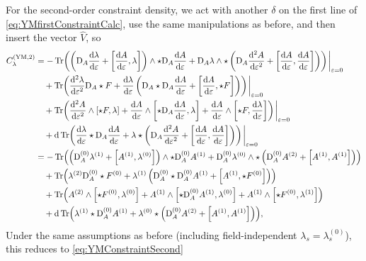 \documentclass[]{jkpaper}
\theoremstyle{plain}
\theoremstyle{definition}
\newcommand{\eps}{\varepsilon}
\newcommand{\DD}[1]{\text{D}_A#1}
\begin{document}
For the second-order constraint density, we act with another $\delta$ on the first line of \eqref{eq:YMfirstConstraintCalc}, use the same manipulations as before, and then insert the vector $\hat{V}$, so 
\begin{equation}
    \begin{split}
        C_\lambda^{(\text{YM},2)}
        &= -\Tr(\left(\DD \dv{\lambda}{\eps} + \comm{\dv{A}{\eps}}{\lambda} \right) \wedge \star \DD \dv{A}{\eps} + \DD \lambda \wedge \star \left(\DD \dv[2]{A}{\eps} + \comm{\dv{A}{\eps}}{\dv{A}{\eps}} \right) ) \eval_{\eps = 0}
        \\
        &\hspace{10pt} + \Tr(\dv[2]{\lambda}{\eps}\DD \star F + \dv{\lambda}{\eps} \left(\DD \star \DD \dv{A}{\eps} + \comm{\dv{A}{\eps}}{\star F} \right)) \eval_{\eps = 0}
        \\
        &\hspace{10pt} +\Tr( \dv[2]{A}{\eps} \wedge \comm{\star F}{\lambda} + \dv{A}{\eps} \wedge \comm{\star \DD \dv{A}{\eps}}{\lambda} + \dv{A}{\eps} \wedge \comm{\star F}{\dv{\lambda}{\eps}} ) \eval_{\eps = 0}
        \\
        &\hspace{10pt} + \dd \Tr(\dv{\lambda}{\eps} \star \DD \dv{A}{\eps}+ \lambda\star \left(\DD \dv[2]{A}{\eps} + \comm{\dv{A}{\eps}}{\dv{A}{\eps}} \right)) \eval_{\eps = 0}
        \\
        &= -\Tr(\left(\DD^{(0)} \lambda^{(1)} + \comm{A^{(1)}}{\lambda^{(0)}} \right) \wedge \star \DD^{(0)} A^{(1)} + \DD^{(0)} \lambda^{(0)} \wedge \star \left(\DD^{(0)} A^{(2)} + \comm{A^{(1)}}{A^{(1)}} \right) )
        \\
        &\hspace{10pt} + \Tr(\lambda^{(2)}\DD^{(0)} \star F^{(0)} + \lambda^{(1)} \left(\DD^{(0)} \star \DD^{(0)} A^{(1)} + \comm{A^{(1)}}{\star F^{(0)}} \right)) 
        \\
        &\hspace{10pt} +\Tr( A^{(2)} \wedge \comm{\star F^{(0)}}{\lambda^{(0)}} + A^{(1)} \wedge \comm{\star \DD^{(0)} A^{(1)}}{\lambda^{(0)}} + A^{(1)} \wedge \comm{\star F^{(0)}}{\lambda^{(1)}} ) 
        \\
        &\hspace{10pt} + \dd \Tr(\lambda^{(1)} \star \DD^{(0)} A^{(1)} + \lambda^{(0)} \star\left(\DD^{(0)} A^{(2)} + \comm{A^{(1)}}{A^{(1)}} \right)),
    \end{split}
\end{equation}
Under the same assumptions as before (including field-independent $\lambda_s=\lambda_s^{(0)}$), this reduces to \eqref{eq:YMConstraintSecond}
\end{document}
